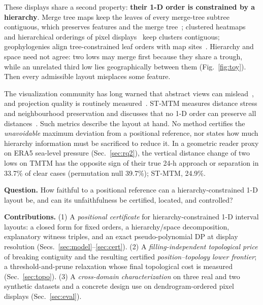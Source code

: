 \documentclass[10pt,twocolumn]{article}
\begin{document}
These displays share a second property: \textbf{their 1-D order is constrained by a hierarchy}. Merge tree maps keep the leaves of every merge-tree subtree contiguous, which preserves features and the merge tree~\cite{tmtm}; clustered heatmaps~\cite{eisen1998} and hierarchical orderings of pixel displays~\cite{franke2021} keep clusters contiguous; geophylogenies align tree-constrained leaf orders with map sites~\cite{geophylo}. Hierarchy and space need not agree: two lows may merge first because they share a trough, while an unrelated third low lies geographically between them (Fig.~\ref{fig:toy}). Then every admissible layout misplaces some feature.

The visualization community has long warned that abstract views can mislead~\cite{mirages,tsne}, and projection quality is routinely measured~\cite{venna,aupetit}. ST-MTM measures distance stress and neighbourhood preservation and discusses that no 1-D order can preserve all distances~\cite{stmtm}. Such metrics describe the layout at hand. No method certifies the \emph{unavoidable} maximum deviation from a positional reference, nor states how much hierarchy information must be sacrificed to reduce it. In a geometric reader proxy on ERA5 sea-level pressure (Sec.~\ref{sec:rq2}), the vertical distance change of two lows on TMTM has the opposite sign of their true 24-h approach or separation in 33.7\% of clear cases (permutation null 39.7\%); ST-MTM, 24.9\%.

\textbf{Question.} How faithful to a positional reference can a hierarchy-constrained 1-D layout be, and can its unfaithfulness be certified, located, and controlled?

\textbf{Contributions.}
(1) A \emph{positional certificate} for hierarchy-constrained 1-D interval layouts: a closed form for fixed orders, a hierarchy/space decomposition, explanatory witness triples, and an exact pseudo-polynomial DP at display resolution (Secs.~\ref{sec:model}--\ref{sec:cert}).
(2) A \emph{filling-independent topological price} of breaking contiguity and the resulting certified \emph{position--topology lower frontier}; a threshold-and-prune relaxation whose final topological cost is measured (Sec.~\ref{sec:topo}).
(3) A \emph{cross-domain characterization} on three real and two synthetic datasets and a concrete design use on dendrogram-ordered pixel displays (Sec.~\ref{sec:eval}).
\end{document}
